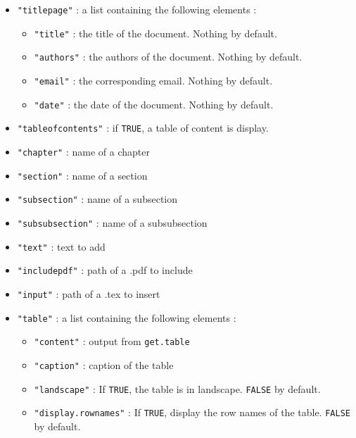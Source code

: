 \documentclass{article}\usepackage[]{graphicx}\usepackage[]{color}
\begin{document}
\begin{itemize}
\item \texttt{"titlepage"} : a list containing the following elements :
	\begin{itemize}
	\item \texttt{"title"} : the title of the document. Nothing by default.
	\item \texttt{"authors"} : the authors of the document. Nothing by default.
	\item \texttt{"email"} : the corresponding email. Nothing by default.
	\item \texttt{"date"} : the date of the document. Nothing by default.
	\end{itemize}

\item \texttt{"tableofcontents"} : if \texttt{TRUE}, a table of content is display.

\item \texttt{"chapter"} : name of a chapter

\item \texttt{"section"} : name of a section

\item \texttt{"subsection"} : name of a subsection

\item \texttt{"subsubsection"} : name of a subsubsection

\item \texttt{"text"} : text to add

\item \texttt{"includepdf"} : path of a .pdf to include

\item \texttt{"input"} : path of a .tex to insert

\item \texttt{"table"} : a list containing the following elements :
	\begin{itemize}
	\item \texttt{"content"} : output from \texttt{get.table}
	\item \texttt{"caption"} : caption of the table
	\item \texttt{"landscape"} : If \texttt{TRUE}, the table is in landscape. \texttt{FALSE} by default.
	\item \texttt{"display.rownames"} : If \texttt{TRUE}, display the row names of the table. \texttt{FALSE} by default.
	\end{itemize}


\end{itemize}
\end{document}
